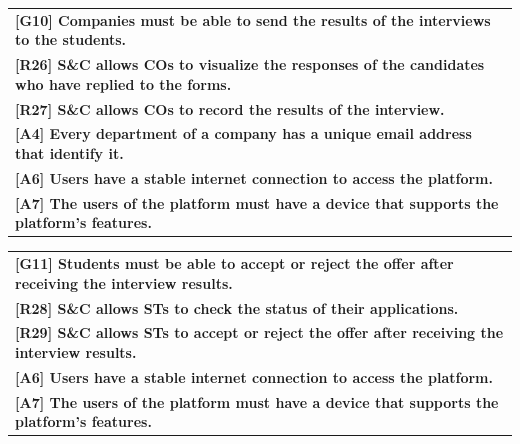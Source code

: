 \begin{center}
    \begin{tabular}{|p{37em}|}
        \rowcolor{bluepoli!40} %
        \hline
        \textbf{[G10] Companies must be able to send the results of the interviews to the students.} \\
        \rowcolor{bluepoli!15}        
        \textbf{[R26] S\&C allows COs to visualize the responses of the candidates who have replied to the forms.} \\
        \rowcolor{bluepoli!15}
        \textbf{[R27] S\&C allows COs to record the results of the interview.} \\
        \textbf{[A4] Every department of a company has a unique email address that identify it.}\\
        \textbf{[A6] Users have a stable internet connection to access the platform.}\\
        \textbf{[A7] The users of the platform must have a device that supports the platform's features.}\\

        \hline
    \end{tabular}
\end{center}

\begin{center}
    \begin{tabular}{|p{37em}|}
        \rowcolor{bluepoli!40} %
        \hline
        \textbf{[G11] Students must be able to accept or reject the offer after receiving the interview results.} \\
        \rowcolor{bluepoli!15}
        \textbf{[R28] S\&C allows STs to check the status of their applications.} \\
        \rowcolor{bluepoli!15}
        \textbf{[R29] S\&C allows STs to accept or reject the offer after receiving the interview results.} \\
        \textbf{[A6] Users have a stable internet connection to access the platform.}\\
        \textbf{[A7] The users of the platform must have a device that supports the platform's features.}\\
        \hline
    \end{tabular}
\end{center}

